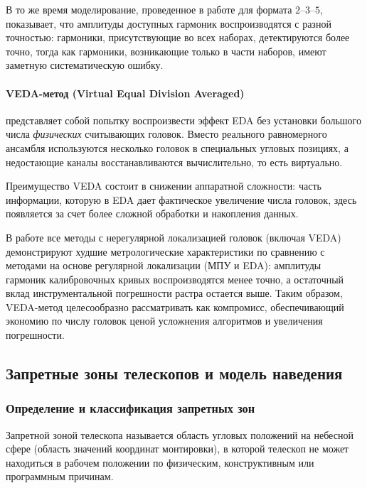 В то же время моделирование, проведенное в работе \cite{kiryanov-overview} для формата $2$–$3$–$5$, показывает, что амплитуды доступных гармоник воспроизводятся с разной точностью: гармоники, присутствующие во всех наборах, детектируются более точно, тогда как гармоники, возникающие только в части наборов, имеют заметную систематическую ошибку.

\paragraph{VEDA-метод (Virtual Equal Division Averaged)} \cite{ishii-veda}
представляет собой попытку воспроизвести эффект EDA без установки большого числа \textit{физических} считывающих головок.
Вместо реального равномерного ансамбля используются несколько головок в специальных угловых позициях, а недостающие каналы восстанавливаются вычислительно, то есть виртуально.

Преимущество VEDA состоит в снижении аппаратной сложности: часть информации, которую в EDA дает фактическое увеличение числа головок, здесь появляется за счет более сложной обработки и накопления данных.

В работе \cite{kiryanov-overview} все методы с нерегулярной локализацией головок (включая VEDA) демонстрируют худшие метрологические характеристики по сравнению с методами на основе регулярной локализации (МПУ и EDA): амплитуды гармоник калибровочных кривых воспроизводятся менее точно, а остаточный вклад инструментальной погрешности растра остается выше.
Таким образом, VEDA-метод целесообразно рассматривать как компромисс, обеспечивающий экономию по числу головок ценой усложнения алгоритмов и увеличения погрешности.

\subsection{Запретные зоны телескопов и модель наведения}
\label{sec:forbidden}

\subsubsection{Определение и классификация запретных зон}
\label{subsec:forbidden_def}

Запретной зоной телескопа называется область угловых положений на небесной сфере (область значений координат монтировки), в которой телескоп не может находиться в рабочем положении по физическим, конструктивным или программным причинам.


